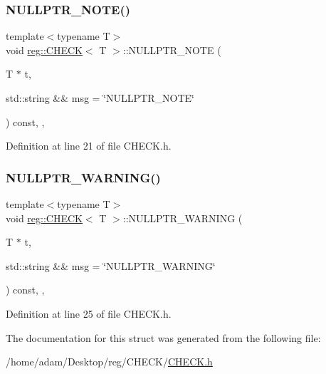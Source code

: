 \subsubsection{\texorpdfstring{N\+U\+L\+L\+P\+T\+R\+\_\+\+N\+O\+T\+E()}{NULLPTR\_NOTE()}}
{\footnotesize\ttfamily template$<$typename T$>$ \\
void \hyperlink{structreg_1_1_c_h_e_c_k}{reg\+::\+C\+H\+E\+CK}$<$ T $>$\+::N\+U\+L\+L\+P\+T\+R\+\_\+\+N\+O\+TE (\begin{DoxyParamCaption}\item[{T $\ast$}]{t,  }\item[{std\+::string \&\&}]{msg = {\ttfamily \char`\"{}NULLPTR\+\_\+NOTE\char`\"{}} }\end{DoxyParamCaption}) const\hspace{0.3cm}{\ttfamily [inline]}, {\ttfamily [protected]}, {\ttfamily [noexcept]}}



Definition at line 21 of file C\+H\+E\+C\+K.\+h.

\mbox{\label{structreg_1_1_c_h_e_c_k_aaa2449b02889f76964587061684795d2}} 
\subsubsection{\texorpdfstring{N\+U\+L\+L\+P\+T\+R\+\_\+\+W\+A\+R\+N\+I\+N\+G()}{NULLPTR\_WARNING()}}
{\footnotesize\ttfamily template$<$typename T$>$ \\
void \hyperlink{structreg_1_1_c_h_e_c_k}{reg\+::\+C\+H\+E\+CK}$<$ T $>$\+::N\+U\+L\+L\+P\+T\+R\+\_\+\+W\+A\+R\+N\+I\+NG (\begin{DoxyParamCaption}\item[{T $\ast$}]{t,  }\item[{std\+::string \&\&}]{msg = {\ttfamily \char`\"{}NULLPTR\+\_\+WARNING\char`\"{}} }\end{DoxyParamCaption}) const\hspace{0.3cm}{\ttfamily [inline]}, {\ttfamily [protected]}, {\ttfamily [noexcept]}}



Definition at line 25 of file C\+H\+E\+C\+K.\+h.



The documentation for this struct was generated from the following file\+:\begin{DoxyCompactItemize}
\item 
/home/adam/\+Desktop/reg/\+C\+H\+E\+C\+K/\hyperlink{_c_h_e_c_k_8h}{C\+H\+E\+C\+K.\+h}\end{DoxyCompactItemize}
